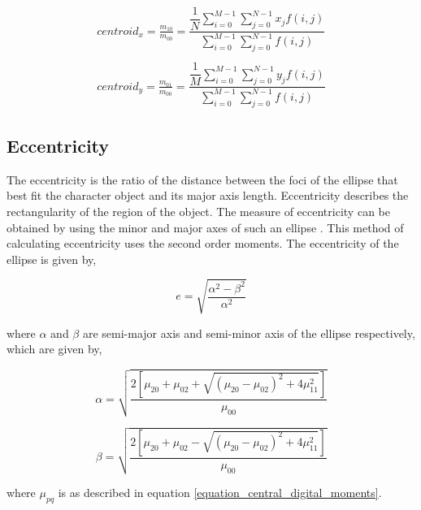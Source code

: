 \begin{subequations}\label{equation_centroidx_centroidy}
\begin{align}
centroid_x=\frac{m_{10}}{m_{00}} = \dfrac{\dfrac{1}{N}\sum\limits_{i=0}^{M-1}\sum\limits_{j=0}^{N-1}x_jf(i,j)}{\sum\limits_{i=0}^{M-1}\sum\limits_{j=0}^{N-1}f(i,j)}\\\nonumber\\
centroid_y=\frac{m_{01}}{m_{00}} = \dfrac{\dfrac{1}{M}\sum\limits_{i=0}^{M-1}\sum\limits_{j=0}^{N-1}y_jf(i,j)}{\sum\limits_{i=0}^{M-1}\sum\limits_{j=0}^{N-1}f(i,j)}
\end{align}
\end{subequations}


\subsection{Eccentricity}
\label{section_eccentricity}
The eccentricity is the ratio of the distance between the foci of the ellipse that best fit the character object and its major axis length. Eccentricity describes the rectangularity of the region of the object. The measure of eccentricity can be obtained by using the minor and major axes of such an ellipse \cite{Rosin1999}. This method of calculating eccentricity uses the second order moments. The eccentricity of the ellipse is given by,


\begin{equation}
e=\sqrt{\dfrac{\alpha^2-\beta^2}{\alpha^2}}
\end{equation}

where $\alpha$ and $\beta$ are semi-major axis and semi-minor axis of the ellipse respectively, which are given by,

\begin{equation}
\alpha=\sqrt{\dfrac{2[\mu_{20}+\mu_{02}+\sqrt{(\mu_{20}-\mu_{02})^2+4\mu_{11}^2}]}{\mu_{00}}}
\end{equation}

\begin{equation}
\beta=\sqrt{\dfrac{2[\mu_{20}+\mu_{02}-\sqrt{(\mu_{20}-\mu_{02})^2+4\mu_{11}^2}]}{\mu_{00}}}
\end{equation}

where $\mu_{pq}$ is as described in equation \ref{equation_central_digital_moments}.

